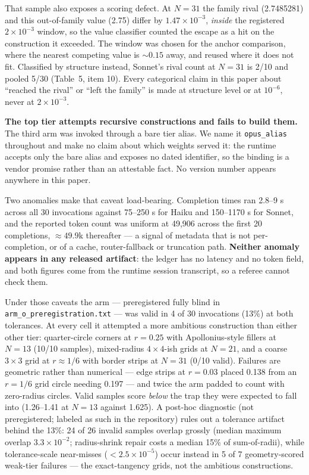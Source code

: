 \documentclass[11pt]{article}
\begin{document}
That sample also exposes a scoring defect. At $N = 31$ the family rival (2.7485281) and this
out-of-family value (2.75) differ by $1.47\times10^{-3}$, \textit{inside} the registered $2\times10^{-3}$ window, so the
value classifier counted the escape as a hit on the construction it exceeded. The window was
chosen for the anchor comparison, where the nearest competing value is ${\sim}0.15$ away, and reused
where it does not fit. Classified by structure instead, Sonnet's rival count at $N = 31$ is 2/10
and pooled 5/30 (Table~5, item 10). Every categorical claim in this paper about ``reached the
rival'' or ``left the family'' is made at structure level or at $10^{-6}$, never at $2\times10^{-3}$.

\textbf{The top tier attempts recursive constructions and fails to build them.} The third arm was
invoked through a bare tier alias. We name it \texttt{opus\_alias} throughout and make no claim about
which weights served it: the runtime accepts only the bare alias and exposes no dated
identifier, so the binding is a vendor promise rather than an attestable fact. No version number
appears anywhere in this paper.

Two anomalies make that caveat load-bearing. Completion times ran 2.8--9 s across all 30
invocations against 75--250 s for Haiku and 150--1170 s for Sonnet, and the reported token count
was uniform at 49,906 across the first 20 completions, ${\approx}49.9$k thereafter --- a signal of metadata
that is not per-completion, or of a cache, router-fallback or truncation path. \textbf{Neither anomaly
appears in any released artifact}: the ledger has no latency and no token field, and both
figures come from the runtime session transcript, so a referee cannot check them.

Under those caveats the arm --- preregistered fully blind in \texttt{arm\_o\_preregistration.txt} --- was
valid in 4 of 30 invocations (13\%) at both tolerances. At every cell it attempted a more
ambitious construction than either other tier: quarter-circle corners at $r = 0.25$ with
Apollonius-style fillers at $N = 13$ (10/10 samples), mixed-radius $4\times4$-ish grids at $N = 21$, and a
coarse $3\times3$ grid at $r \approx 1/6$ with border strips at $N = 31$ (0/10 valid). Failures are geometric
rather than numerical --- edge strips at $r = 0.03$ placed 0.138 from an $r = 1/6$ grid circle needing
0.197 --- and twice the arm padded to count with zero-radius circles. Valid samples score \textit{below}
the trap they were expected to fall into (1.26--1.41 at $N = 13$ against 1.625). A post-hoc
diagnostic (not preregistered; labeled as such in the repository) rules out a tolerance
artifact behind the 13\%: 24 of 26 invalid samples overlap grossly (median maximum overlap
$3.3\times10^{-2}$; radius-shrink repair costs a median 15\% of sum-of-radii), while
tolerance-scale near-misses ($< 2.5\times10^{-5}$) occur instead in 5 of 7 geometry-scored
weak-tier failures --- the exact-tangency grids, not the ambitious constructions.
\end{document}
